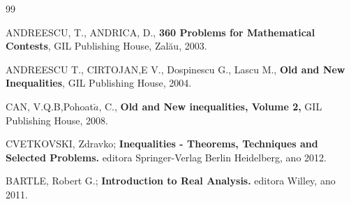 \documentclass[12pt, a4paper, oneside]{book}
\begin{document}
\newpage
\begin{thebibliography}{99}
	
	 ANDREESCU, T., ANDRICA, D., {\bf 360 Problems for Mathematical Contests}, GIL Publishing House, Zalău, 2003.
	
	  ANDREESCU T., CIRTOJAN,E V., Dospinescu G., Lascu M., {\bf Old and New Inequalities}, GIL Publishing House, 2004.
	
	 CAN, V.Q.B,Pohoat$\breve{a}$, C., {\bf Old and New inequalities, Volume 2,} GIL Publishing House, 2008.
	
	 CVETKOVSKI, Zdravko; {\bf Inequalities - Theorems, Techniques and Selected Problems.}	editora Springer-Verlag Berlin Heidelberg, ano 2012.
	
	 BARTLE, Robert G.; {\bf Introduction to Real Analysis.}
	editora Willey, ano 2011.
	
\end{thebibliography}


\renewcommand{\refname}{APÊNDICES}
\appendix %



\end{document}
